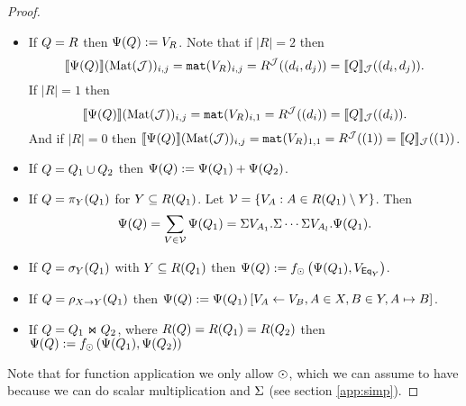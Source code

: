 \begin{proof}
\begin{itemize}
  \item If $Q = R$ then $\Psi (Q):=V_R$. Note that if $|R|=2$ then 
    $$\llbracket \Psi(Q) \rrbracket(\text{Mat}(\mathcal{J}))_{i,j}=\texttt{mat}(V_R)_{i,j} = R^{\mathcal{J}}((d_i, d_j))=\llbracket Q \rrbracket_{\mathcal{J}}((d_i, d_j)).$$ 
    If $|R|=1$ then 
    $$\llbracket \Psi(Q) \rrbracket(\text{Mat}(\mathcal{J}))_{i,j}=\texttt{mat}(V_R)_{i,1} = R^{\mathcal{J}}((d_i))=\llbracket Q \rrbracket_{\mathcal{J}}((d_i)).$$
    And if $|R|=0$ then 
    $\llbracket \Psi(Q) \rrbracket(\text{Mat}(\mathcal{J}))_{i,j}=\texttt{mat}(V_R)_{1,1} = R^{\mathcal{J}}((1))=\llbracket Q \rrbracket_{\mathcal{J}}((1))$.
  \item If $Q=Q_1\cup Q_2$ then $\Psi(Q):=\Psi(Q_1)+\Psi(Q_2)$.
  \item If $Q = \pi_{Y}(Q_1)$ for $Y\subseteq R(Q_1)$. Let $\mathcal{V} = \lbrace V_A:A\in R(Q_1)\setminus Y \rbrace$. 
    Then
    $$
    \Psi(Q) = \sum_{V\in\mathcal{V}} \Psi(Q_1) = \Sigma V_{A_1}. \Sigma \cdots \Sigma V_{A_{l}}. \Psi(Q_1).
    $$
  \item If $Q = \sigma_Y(Q_1)$ with $Y\subseteq R(Q_1)$ then 
    $\Psi(Q):=f_{\odot}\left( \Psi(Q_1), V_{\mathsf{Eq}_Y} \right)$.
  \item If $Q = \rho_{X\rightarrow Y}(Q_1)$ then $\Psi (Q):= \Psi (Q_1)\left[ V_A\gets V_B, A\in X, B\in Y, A \mapsto B \right]$.
  \item If $Q = Q_1\Join Q_2$, where $R(Q)=R(Q_1)=R(Q_2)$ then 
    $\Psi (Q):=f_{\odot}\left( \Psi (Q_1), \Psi (Q_2) \right)$
\end{itemize}

Note that for function application we only allow $\odot$, 
which we can assume to have because we can do scalar multiplication and $\Sigma$ (see section \ref{app:simp}).

\end{proof}
